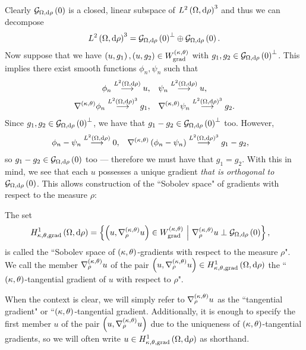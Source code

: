 Clearly $\gradZero{\ddom}{\rho}$ is a closed, linear subspace of $\ltwo{\ddom}{\rho}^3$ and thus we can decompose 
\begin{align*}
	\ltwo{\ddom}{\rho}^3 = \gradZero{\ddom}{\rho}^{\perp} \oplus \gradZero{\ddom}{\rho}.
\end{align*}
Now suppose that we have $\bracs{u,g_1}, \bracs{u,g_2}\in W^{\kt}_{\mathrm{grad}}$ with $g_1, g_2\in\gradZero{\ddom}{\rho}^\perp$.
This implies there exist smooth functions $\phi_n, \psi_n$ such that
\begin{align*}
	\phi_n \lconv{\ltwo{\ddom}{\rho}} u, &\quad \psi_n \lconv{\ltwo{\ddom}{\rho}} u, \\
	\ktgrad\phi_n \lconv{\ltwo{\ddom}{\rho}^3} g_1, &\quad \ktgrad\psi_n \lconv{\ltwo{\ddom}{\rho}^3} g_2.
\end{align*}
Since $g_1, g_2\in \gradZero{\ddom}{\rho}^{\perp}$, we have that $g_1-g_2\in \gradZero{\ddom}{\rho}^{\perp}$ too.
However, 
\begin{align*}
	\phi_n - \psi_n \lconv{\ltwo{\ddom}{\rho}} 0, &\quad \ktgrad\bracs{\phi_n-\psi_n} \lconv{\ltwo{\ddom}{\rho}^3} g_1 - g_2,
\end{align*}
so $g_1 - g_2\in \gradZero{\ddom}{\rho}$ too --- therefore we must have that $g_1=g_2$.
With this in mind, we see that each $u$ possesses a unique gradient \emph{that is orthogonal to} $\gradZero{\ddom}{\rho}$.
This allows construction of the ``Sobolev space" of gradients with respect to the measure $\rho$:
\begin{definition} \label{def:3DGradSobSpace}
	The set
	\begin{align*}
		\ktgradSob{\ddom}{\rho} &= \clbracs{ \bracs{u, \ktgrad_{\rho}u}\in W^{\kt}_{\mathrm{grad}} \setVert \ktgrad_{\rho}u \perp \gradZero{\ddom}{\rho} },
	\end{align*}
	is called the ``Sobolev space of $\kt$-gradients with respect to the measure $\rho$".
	We call the member $\ktgrad_{\rho}u$ of the pair $\bracs{u, \ktgrad_{\rho}u}\in\ktgradSob{\ddom}{\rho}$ the ``$\kt$-tangential gradient of $u$ with respect to $\rho$".
\end{definition}
When the context is clear, we will simply refer to $\ktgrad_{\rho}u$ as the ``tangential gradient" or ``$\kt$-tangential gradient.
Additionally, it is enough to specify the first member $u$ of the pair $\bracs{u, \ktgrad_{\rho}u}$ due to the uniqueness of $\kt$-tangential gradients, so we will often write $u\in\ktgradSob{\ddom}{\rho}$ as shorthand.

